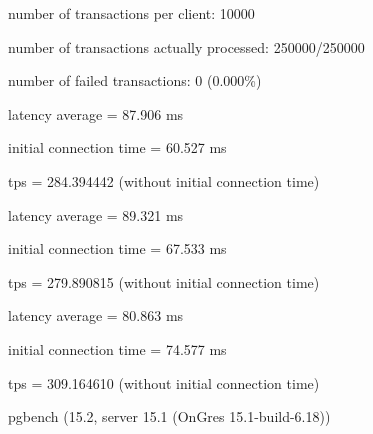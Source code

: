 number of transactions per client: 10000

number of transactions actually processed: 250000/250000

number of failed transactions: 0 (0.000\%)

latency average = 87.906 ms

initial connection time = 60.527 ms

tps = 284.394442 (without initial connection time)

latency average = 89.321 ms

initial connection time = 67.533 ms

tps = 279.890815 (without initial connection time)

latency average = 80.863 ms

initial connection time = 74.577 ms

tps = 309.164610 (without initial connection time)

pgbench (15.2, server 15.1 (OnGres 15.1-build-6.18))

